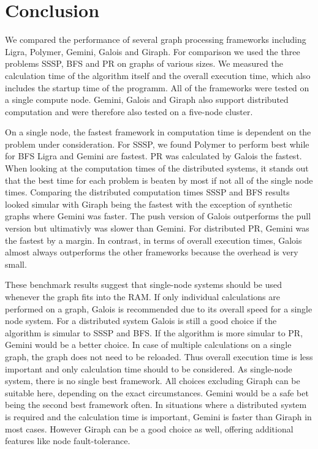 
\section{Conclusion}

We compared the performance of several graph processing frameworks including Ligra, Polymer, Gemini, Galois and Giraph. 
For comparison we used the three problems SSSP, BFS and PR on graphs of various sizes.
We measured the calculation time of the algorithm itself and the overall execution time, which also includes the startup time of the programm.
All of the frameworks were tested on a single compute node. Gemini, Galois and Giraph also support distributed computation and were therefore also tested on a five-node cluster.

On a single node, the fastest framework in computation time is dependent on the problem under consideration.
For SSSP, we found Polymer to perform best while for BFS Ligra and Gemini are fastest. PR was calculated by Galois the fastest.
When looking at the computation times of the distributed systems, it stands out that the best time for each problem is beaten by most if not all of the single node times.
Comparing the distributed computation times SSSP and BFS results looked simular with Giraph being the fastest with the exception of synthetic graphs where Gemini was faster. The push version of Galois outperforms the pull version but ultimativly was slower than Gemini. For distributed PR, Gemini was the fastest by a margin.
In contrast, in terms of overall execution times, Galois almost always outperforms the other frameworks because the overhead is very small.

These benchmark results suggest that single-node systems should be used whenever the graph fits into the RAM. 
If only individual calculations are performed on a graph, Galois is recommended due to its overall speed for a single node system. 
For a distributed system Galois is still a good choice if the algorithm is simular to SSSP and BFS. If the algorithm is more simular to PR, Gemini would be a better choice.
In case of multiple calculations on a single graph, the graph does not need to be reloaded. Thus overall execution time is less important and only calculation time should to be considered.
As single-node system, there is no single best framework. All choices excluding Giraph can be suitable here, depending on the exact circumstances. Gemini would be a safe bet being the second best framework often. 
In situations where a distributed system is required and the calculation time is important, Gemini is faster than Giraph in most cases.
However Giraph can be a good choice as well, offering additional features like node fault-tolerance.


